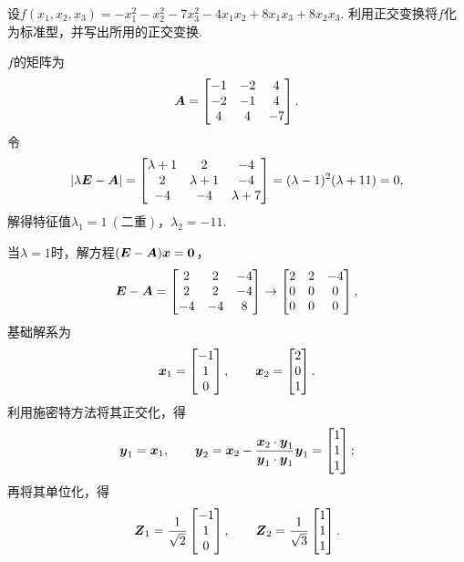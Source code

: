 \begin{example}
设\(f(x_1,x_2,x_3) = -x_1^2-x_2^2-7x_3^2-4x_1x_2+8x_1x_3+8x_2x_3\).
利用正交变换将\(f\)化为标准型，并写出所用的正交变换.
\begin{solution}
\(f\)的矩阵为\[
	\boldsymbol{A} = \begin{bmatrix}
		-1 & -2 & 4 \\
		-2 & -1 & 4 \\
		4 & 4 & -7
	\end{bmatrix}.
\]
令\[
	\abs{\lambda\boldsymbol{E}-\boldsymbol{A}}
	= \begin{bmatrix}
		\lambda+1 & 2 & -4 \\
		2 & \lambda+1 & -4 \\
		-4 & -4 & \lambda+7
	\end{bmatrix}
	= (\lambda-1)^2 (\lambda+11)
	= 0,
\]
解得特征值\(\lambda_1=1\ (\text{二重})\)，\(\lambda_2=-11\).

当\(\lambda=1\)时，解方程\((\boldsymbol{E}-\boldsymbol{A})\boldsymbol{x}=\boldsymbol0\)，\[
	\boldsymbol{E}-\boldsymbol{A} = \begin{bmatrix}
		2 & 2 & -4 \\
		2 & 2 & -4 \\
		-4 & -4 & 8
	\end{bmatrix}
	\to \begin{bmatrix}
		2 & 2 & -4 \\
		0 & 0 & 0 \\
		0 & 0 & 0
	\end{bmatrix},
\]基础解系为\[
	\boldsymbol{x}_1 = \begin{bmatrix} -1 \\ 1 \\ 0 \end{bmatrix},
	\qquad
	\boldsymbol{x}_2 = \begin{bmatrix} 2 \\ 0 \\ 1 \end{bmatrix}.
\]
利用施密特方法将其正交化，得\[
	\boldsymbol{y}_1=\boldsymbol{x}_1,
	\qquad
	\boldsymbol{y}_2=\boldsymbol{x}_2-\frac{\boldsymbol{x}_2\cdot\boldsymbol{y}_1}{\boldsymbol{y}_1\cdot\boldsymbol{y}_1}\boldsymbol{y}_1
	=\begin{bmatrix} 1 \\ 1 \\ 1 \end{bmatrix};
\]再将其单位化，得\[
	\boldsymbol{Z}_1
	= \frac{1}{\sqrt{2}} \begin{bmatrix} -1 \\ 1 \\ 0 \end{bmatrix},
	\qquad
	\boldsymbol{Z}_2
	= \frac{1}{\sqrt{3}} \begin{bmatrix} 1 \\ 1 \\ 1 \end{bmatrix}.
\]


\end{solution}
\end{example}

